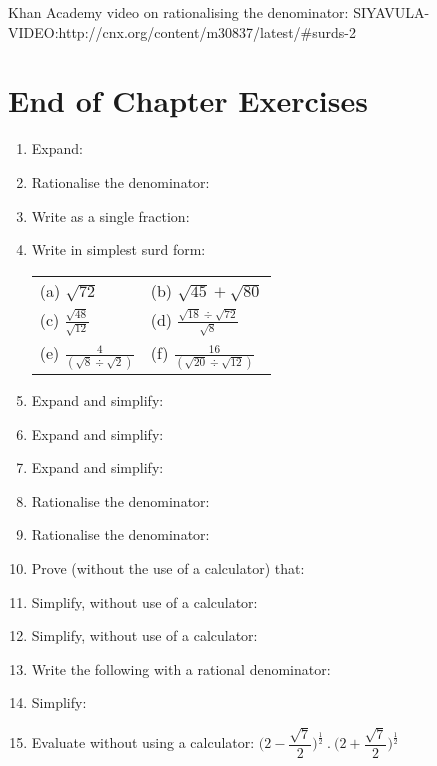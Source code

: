Khan Academy video on rationalising the denominator: SIYAVULA-VIDEO:http://cnx.org/content/m30837/latest/#surds-2

\section{End of Chapter Exercises}
\begin{enumerate}
\item{Expand:
}
\item{Rationalise the denominator:
}
\item{Write as a single fraction:
}
\item{Write in simplest surd form:
\begin{center}
\begin{tabular}{p{4cm}p{4cm}}
(a) $\sqrt{72}$ & (b) $\sqrt{45} + \sqrt{80}$ \\
(c) $\frac{\sqrt{48}}{\sqrt{12}}$ & (d) $\frac{\sqrt{18} \div \sqrt{72}}{\sqrt{8}}$\\
(e) $\frac{4}{(\sqrt{8} \div \sqrt{2})}$ & (f) $\frac{16}{(\sqrt{20} \div \sqrt{12})}$\\
\end{tabular}
\end{center}
}
\item{Expand and simplify:
}
\item{Expand and simplify:
}
\item{Expand and simplify:
}

\item{Rationalise the denominator:
}
\item{Rationalise the denominator:
}
\item{Prove (without the use of a calculator) that:
}
\item{Simplify, without use of a calculator:
}
\item{Simplify, without use of a calculator:
}
\item{Write the following with a rational denominator:
}
\item{Simplify:
}
\item{Evaluate without using a calculator: $\biggl(2 - \dfrac{\sqrt{7}}{2}\biggr)^{\tfrac{1}{2}} \: . \: \biggl(2 + \dfrac{\sqrt{7}}{2}\biggr)^{\tfrac{1}{2}}$} 


\end{enumerate}
